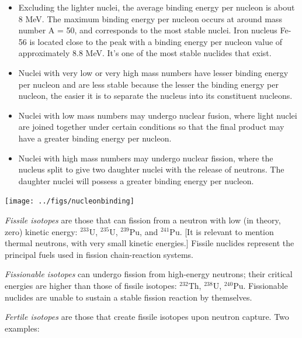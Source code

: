 \documentclass[12pt]{article}
\newif\ifeqns
\begin{document}
\begin{itemize}
\item Excluding the lighter nuclei, the average binding energy per nucleon is about 8 MeV.
The maximum binding energy per nucleon occurs at around mass number A = 50, and corresponds to the most stable nuclei. Iron nucleus Fe-56 is located close to the peak with a binding energy per nucleon value of approximately 8.8 MeV. It's one of the most stable nuclides that exist.
\item Nuclei with very low or very high mass numbers have lesser binding energy per nucleon and are less stable because the lesser the binding energy per nucleon, the easier it is to separate the nucleus into its constituent nucleons.
\item Nuclei with low mass numbers may undergo nuclear fusion, where light nuclei are joined together under certain conditions so that the final product may have a greater binding energy per nucleon.
\item Nuclei with high mass numbers may undergo nuclear fission, where the nucleus split to give two daughter nuclei with the release of neutrons. The daughter nuclei will possess a greater binding energy per nucleon.
\end{itemize}


\begin{center}
\texttt{[image: ../figs/nucleonbinding]}
\end{center}


\textit{Fissile isotopes} are those that can fission from a neutron with low (in theory, zero) kinetic energy: $^{233}$U, $^{235}$U, $^{239}$Pu, and $^{241}$Pu. [It is relevant to mention thermal neutrons, with very small kinetic energies.] Fissile nuclides represent the principal fuels used in fission chain-reaction systems. 

\textit{Fissionable isotopes} can undergo fission from high-energy neutrons; their critical energies are higher than those of fissile isotopes: $^{232}$Th, $^{238}$U, $^{240}$Pu. Fissionable nuclides are unable to sustain a stable fission reaction by themselves.

\textit{Fertile isotopes} are those that create fissile isotopes upon neutron capture. Two examples:
\ifeqns
$^{238}\text{U}+n \stackrel{\gamma}{\rightarrow} \, ^{239}\text{U}\stackrel{\beta^-}{\rightarrow} \, ^{239}\text{Np}\stackrel{\beta^-}{\rightarrow} \, ^{239}\text{Pu}$

$^{232}\text{Th}+n \stackrel{\gamma}{\rightarrow} \,^{233}\text{Th}\stackrel{\beta^-}{\rightarrow}\, ^{233}\text{Pa}\stackrel{\beta^-}{\rightarrow} \, ^{233}\text{U}$
\else
\vspace*{3 em}
\fi
\end{document}
